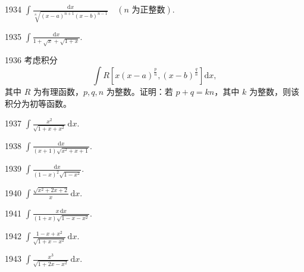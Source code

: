 \begin{prob}[S]{1934}
$\displaystyle \int \frac{\mathrm{d}x}{\sqrt[n]{(x - a)^{n + 1}(x - b)^{n - 1}}} \quad (n \text{ 为正整数})$.
\end{prob}

\begin{prob}[M]{1935}
$\displaystyle \int \frac{\mathrm{d}x}{1 + \sqrt{x} + \sqrt{1 + x}}$.
\end{prob}

\begin{prob}[M]{1936}
考虑积分
\[
\int R\left[x(x - a)^{\frac{p}{n}}, (x - b)^{\frac{q}{n}}\right] \mathrm{d}x,
\]
其中 $R$ 为有理函数，$p, q, n$ 为整数。证明：若 $p + q = kn$，其中 $k$ 为整数，则该积分为初等函数。
\end{prob}


\begin{prob}[S]{1937}
$\displaystyle \int \frac{x^2}{\sqrt{1 + x + x^2}}\,\mathrm{d}x$.
\end{prob}

\begin{prob}[S]{1938}
$\displaystyle \int \frac{\mathrm{d}x}{(x + 1)\sqrt{x^2 + x + 1}}$.
\end{prob}

\begin{prob}[S]{1939}
$\displaystyle \int \frac{\mathrm{d}x}{(1 - x)^2\sqrt{1 - x^2}}$.
\end{prob}

\begin{prob}[S]{1940}
$\displaystyle \int \frac{\sqrt{x^2 + 2x + 2}}{x}\,\mathrm{d}x$.
\end{prob}

\begin{prob}[S]{1941}
$\displaystyle \int \frac{x\,\mathrm{d}x}{(1 + x)\sqrt{1 - x - x^2}}$.
\end{prob}

\begin{prob}[S]{1942}
$\displaystyle \int \frac{1 - x + x^2}{\sqrt{1 + x - x^2}}\,\mathrm{d}x$.
\end{prob}


\begin{prob}[S]{1943}
$\displaystyle \int \frac{x^3}{\sqrt{1 + 2x - x^2}}\,\mathrm{d}x$.
\end{prob}

